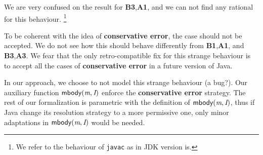 We are very confused on the result for \textbf{B3},\textbf{A1}, and we can not find any rational for this behaviour.
\footnote{We refer to the behaviour of \texttt{javac} as in JDK version is.}


To be coherent with the idea of \textbf{conservative error}, the case should not be accepted.
We do not see how this should behave differently from \textbf{B1},\textbf{A1}, and \textbf{B3},\textbf{A3}.
We fear that the only retro-compatible fix for this strange behaviour is to accept all the cases of \textbf{conservative error} in a future version of Java.


In our approach, we choose to not model this strange behaviour (a bug?).
Our auxiliary function $\textsf{mbody}(\textit{m},\textit{I})$ enforce the \textbf{conservative error} strategy.
The rest of our formalization is parametric with the definition of $\textsf{mbody}(\textit{m},\textit{I})$, thus if Java change its resolution strategy to a more permissive one, only minor adaptations in $\textsf{mbody}(\textit{m},\textit{I})$ would be needed.
